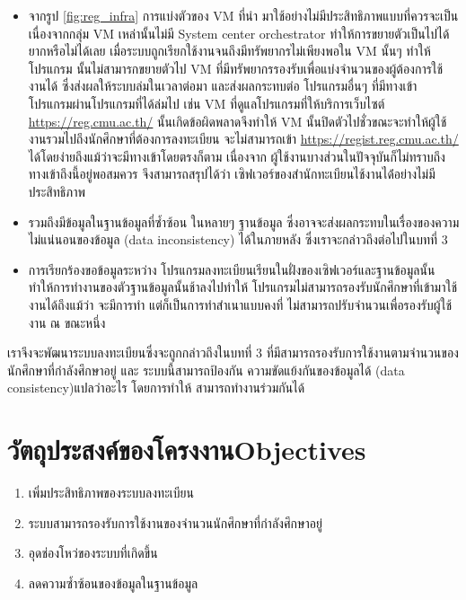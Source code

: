 \begin{itemize}
\item จากรูป \ref{fig:reg_infra} การแบ่งตัวของ VM \cite{vm} ที่นำ มาใช้อย่างไม่มีประสิทธิภาพแบบที่ควรจะเป็น
เนื่องจากกลุ่ม VM เหล่านั้นไม่มี System center orchestrator \cite{sco} ทำให้การขยายตัวเป็นไปได้ยากหรือไม่ได้เลย เมื่อระบบถูกเรียกใช้งานจนถึงมีทรัพยากรไม่เพียงพอใน VM นั้นๆ ทำให้โปรแกรม นั้นไม่สามารกขยายตัวไป VM ที่มีทรัพยากรรองรับเพื่อแบ่งจำนวนของผู้ต้องการใช้งานได้ ซึ่งส่งผลให้ระบบล่มในเวลาต่อมา และส่งผลกระทบต่อ โปรแกรมอื่นๆ 
ที่มีทางเข้าโปรแกรมผ่านโปรแกรมที่ได้ล่มไป เช่น VM ที่ดูแลโปรแกรมที่ให้บริการเว็บไซต์ \url{https://reg.cmu.ac.th/} นั้นเกิดข้อผิดพลาดจึงทำให้ VM นั้นปิดตัวไปชั่วขณะจะทำให้ผู้ใช้งานรวมไปถึงนักศึกษาที่ต้องการลงทะเบียน จะไม่สามารถเข้า \url{https://regist.reg.cmu.ac.th/} ได้โดยง่ายถึงแม้ว่าจะมีทางเข้าโดยตรงก็ตาม เนื่องจาก ผู้ใช้งานบางส่วนในปัจจุบันก็ไม่ทราบถึงทางเข้าถึงนี้อยู่พอสมควร จึงสามารถสรุปได้ว่า เซิฟเวอร์ของสำนักทะเบียนไช้งานได้่อย่างไม่มีประสิทธิภาพ

\item รวมถึงมีข้อมูลในฐานข้อมูลที่ซ้ำซ้อน ในหลายๆ ฐานข้อมูล ซึ่งอาจจะส่งผลกระทบในเรื่องของความไม่แน่นอนของข้อมูล (data inconsistency) ได้ในภายหลัง ซึ่งเราจะกล่าวถึงต่อไปในบทที่ 3

\item การเรียกร้องขอข้อมูลระหว่าง โปรแกรมลงทะเบียนเรียนในฝั่งของเซิฟเวอร์และฐานข้อมูลนั้น ทำให้การทำงานของตัวฐานข้อมูลนั้นช้าลงไปทำให้ โปรแกรมไม่สามารถรองรับนักศึกษาที่เข้ามาใช้งานได้ถึงแม้ว่า จะมีการทำ แต่ก็เป็นการทำสำเนาแบบคงที่ ไม่สามารถปรับจำนวนเพื่อรองรับผู้ใช้งาน ณ ขณะหนึ่ง
\end{itemize}

เราจึงจะพัฒนาระบบลงทะเบียนซึ่งจะถูกกล่าวถึงในบทที่ 3 ที่มีสามารถรองรับการใช้งานตามจำนวนของนักศึกษาที่กำลังศึกษาอยู่ และ ระบบนี้สามารถป้องกัน ความขัดแย้งกันของข้อมูลได้ (data consistency){แปลว่าอะไร} โดยการทำให้ สามารถทำงานร่วมกันได้

\section{\ifcpe วัตถุประสงค์ของโครงงาน\else Objectives\fi}
\begin{enumerate}
    \item เพิ่มประสิทธิภาพของระบบลงทะเบียน
    \item ระบบสามารถรองรับการใช้งานของจำนวนนักศึกษาที่กำลังศึกษาอยู่
    \item อุดช่องโหว่ของระบบที่เกิดขึ้น
    \item ลดความซ้ำซ้อนของข้อมูลในฐานข้อมูล
\end{enumerate}

